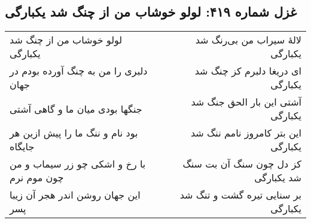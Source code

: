 \begin{center}
\section*{غزل شماره ۴۱۹: لولو خوشاب من از چنگ شد یکبارگی}
\label{sec:419}
\begin{longtable}{l p{0.5cm} r}
لولو خوشاب من از چنگ شد یکبارگی
&&
لالهٔ سیراب من بی‌رنگ شد یکبارگی
\\
دلبری را من به چنگ آورده بودم در جهان
&&
ای دریغا دلبرم کز چنگ شد یکبارگی
\\
جنگها بودی میان ما و گاهی آشتی
&&
آشتی این بار الحق جنگ شد یکبارگی
\\
بود نام و ننگ ما را پیش ازین هر جایگاه
&&
این بتر کامروز نامم ننگ شد یکبارگی
\\
با رخ و اشکی چو زر سیماب و من چون موم نرم
&&
کز دل چون سنگ آن بت سنگ شد یکبارگی
\\
این جهان روشن اندر هجر آن زیبا پسر
&&
بر سنایی تیره گشت و تنگ شد یکبارگی
\\
\end{longtable}
\end{center}
